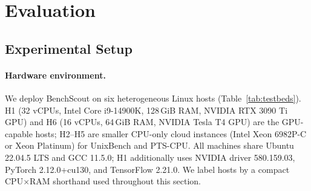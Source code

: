 \documentclass[sigplan,10pt]{acmart}
\newcommand{\ourmethod}{\textsc{BenchScout}\xspace}
\newcommand{\ptscpu}{PTS-CPU}
\newcommand{\ptsgpu}{PTS-GPU}
\newcommand{\appname}{BenchScout}
\begin{document}
\section{Evaluation}
\label{sec:evaluation}

\subsection{Experimental Setup}
\label{subsec:exp-setup}





\paragraph{Hardware environment.}

We deploy \appname{} on six heterogeneous Linux hosts (Table~\ref{tab:testbeds}).
H1 (32 vCPUs, Intel Core i9-14900K, 128\,GiB RAM, NVIDIA RTX 3090 Ti GPU) and H6 (16 vCPUs, 64\,GiB RAM, NVIDIA Tesla T4 GPU) are the GPU-capable hosts; H2--H5 are smaller CPU-only cloud instances (Intel Xeon 6982P-C or Xeon Platinum) for UnixBench and \ptscpu{}.
All machines share Ubuntu 22.04.5 LTS and GCC 11.5.0; H1 additionally uses NVIDIA driver 580.159.03, PyTorch 2.12.0+cu130, and TensorFlow 2.21.0.
We label hosts by a compact CPU$\times$RAM shorthand used throughout this section.
\end{document}
